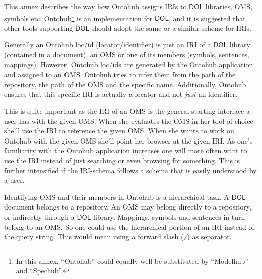 \documentclass[10pt, a4paper]{isov2}
\newcommand*{\DOL}{\ensuremath{\mathsf{DOL}}\xspace}
\begin{document}
\newenvironment{oitemize}{%
  \renewcommand{\labelitemii}{$\bullet$}%
  \vspace{-15pt}
   \begin{itemize} }
  { \end{itemize} }


This annex describes the way how Ontohub assigns IRIs to \DOL
libraries, OMS, symbols etc. Ontohub\footnote{In this annex,
  ``Ontohub'' could equally well be substituted by ``Modelhub'' and
  ``Spechub''.} is  an implementation  for \DOL, and it is
suggested that other tools supporting \DOL should adopt the same or a
similar scheme for IRIs.




Generally an Ontohub loc/id (locator/identifier) is just an IRI of a
\DOL library (contained in a document), an OMS
or one of its members (symbols, sentences, mappings). However,
Ontohub loc/ids are generated by the Ontohub application and assigned to an
OMS. Ontohub tries to infer them from the path of the repository, the path of
the OMS and the specific name. Additionally, Ontohub ensures that this specific
IRI is actually a locator and not \emph{just} an identifier.

This is quite important as the IRI of an OMS is the general starting
interface a user has with the given OMS. When she evaluates the OMS
in her tool of choice she'll use the IRI to reference the given OMS. When
she wants to work on Ontohub with the given OMS she'll point her browser
at the given IRI. As one's familiarity with the Ontohub application increases one
will more often want to use the IRI instead of just searching or even browsing
for something.  This is further intensified if the IRI-schema follows a schema
that is easily understood by a user.



Identifying OMS and their members in Ontohub is a hierarchical
task. A \DOL document belongs to a repository. An OMS may belong
directly to a repository, or indirectly through a \DOL library. Mappings,
symbols and sentences in turn belong to an OMS. So one could use the
hierarchical portion of an IRI instead of the query string.  This
would mean using a forward slash (\emph{/}) as separator.
\end{document}
